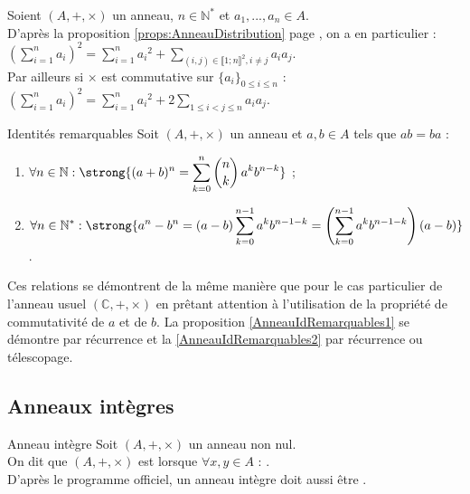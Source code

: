 \documentclass[12pt,a4paper]{report}
\begin{document}
    \begin{remarque}Soient $(A, +, \times)$ un anneau, $n \in \mathbb{N}^*$ et $a_1, ..., a_n \in A$.\\
    D'après la proposition \ref{props:AnneauDistribution} page \pageref{props:AnneauDistribution}, on a en particulier : $\displaystyle \left( \sum_{i = 1}^n a_i \right)^2 = \sum_{i = 1}^n {a_i}^2 + \sum_{(i, j) \in \llbracket 1 ; n \rrbracket^2, i \neq j} a_ia_j$.\\
    Par ailleurs si $\times$ est commutative sur $\{a_i\}_{0 \leqslant i \leqslant n}$ : $\displaystyle \left( \sum_{i = 1}^n a_i \right)^2 = \sum_{i = 1}^n {a_i}^2 + 2 \sum_{1 \leqslant i < j \leqslant n} a_ia_j$.
    \end{remarque}
    
    \begin{propositions}{Identités remarquables}{}
    Soit $(A, +, \times)$ un anneau et $a, b \in A$ tels que $ab = ba$ :
    \begin{enumerate}[label=\bfseries\arabic*)]
        \item\label{AnneauIdRemarquables1} $\displaystyle \forall n \in \mathbb{N} : \strong{(a + b)^n = \sum_{k = 0}^n \binom{n}{k}\, a^k b^{n-k}}$ ;
        \item\label{AnneauIdRemarquables2} $\displaystyle \forall n \in \mathbb{N}^* : \strong{a^n - b^n = (a - b)\sum_{k = 0}^{n-1} a^kb^{n-1-k} = \left(\sum_{k = 0}^{n-1} a^kb^{n-1-k}\right) (a - b)}$.
    \end{enumerate}
    \end{propositions}
    
    \begin{demo}[Démonstrations]
    Ces relations se démontrent de la même manière que pour le cas particulier de l'anneau usuel $(\mathbb{C}, +, \times)$ en prêtant attention à l'utilisation de la propriété de commutativité de $a$ et de $b$. La proposition \ref{AnneauIdRemarquables1} se démontre par récurrence et la \ref{AnneauIdRemarquables2} par récurrence ou télescopage.
    \end{demo}
    
    
    \subsection{Anneaux intègres}
    
    \begin{definition}{Anneau intègre}{}
    Soit $(A, +, \times)$ un anneau non nul.\\
    On dit que $(A, +, \times)$ est  lorsque $\forall x, y \in A$ : .\\
    D'après le programme officiel, un anneau intègre doit aussi être .
    \end{definition}
    
\end{document}
